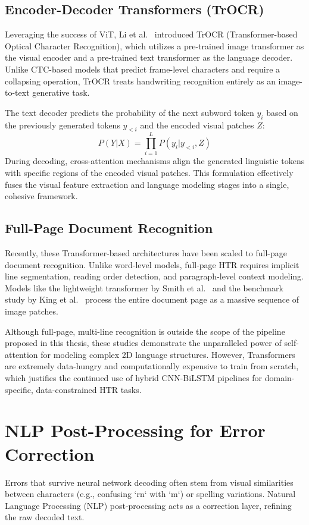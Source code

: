 \subsection{Encoder-Decoder Transformers (TrOCR)}
Leveraging the success of ViT, Li et al.~\cite{li2021trocr} introduced TrOCR (Transformer-based Optical Character Recognition), which utilizes a pre-trained image transformer as the visual encoder and a pre-trained text transformer as the language decoder. Unlike CTC-based models that predict frame-level characters and require a collapsing operation, TrOCR treats handwriting recognition entirely as an image-to-text generative task.

The text decoder predicts the probability of the next subword token $y_i$ based on the previously generated tokens $y_{<i}$ and the encoded visual patches $Z$:
\begin{equation}
    P(Y | X) = \prod_{i=1}^{L} P(y_i | y_{<i}, Z)
\end{equation}
During decoding, cross-attention mechanisms align the generated linguistic tokens with specific regions of the encoded visual patches. This formulation effectively fuses the visual feature extraction and language modeling stages into a single, cohesive framework. 

\subsection{Full-Page Document Recognition}
Recently, these Transformer-based architectures have been scaled to full-page document recognition. Unlike word-level models, full-page HTR requires implicit line segmentation, reading order detection, and paragraph-level context modeling. Models like the lightweight transformer by Smith et al.~\cite{msdoctr2023lightweight} and the benchmark study by King et al.~\cite{study2025transformer} process the entire document page as a massive sequence of image patches.

Although full-page, multi-line recognition is outside the scope of the pipeline proposed in this thesis, these studies demonstrate the unparalleled power of self-attention for modeling complex 2D language structures. However, Transformers are extremely data-hungry and computationally expensive to train from scratch, which justifies the continued use of hybrid CNN-BiLSTM pipelines for domain-specific, data-constrained HTR tasks.

\section{NLP Post-Processing for Error Correction}
Errors that survive neural network decoding often stem from visual similarities between characters (e.g., confusing `rn` with `m`) or spelling variations. Natural Language Processing (NLP) post-processing acts as a correction layer, refining the raw decoded text.

